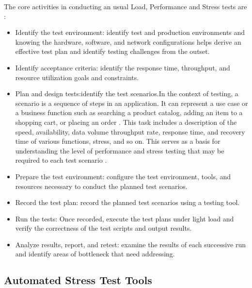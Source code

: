 The core activities in conducting an usual Load, Performance and Stress tests are \cite{Erinle2013}: 

\begin{itemize}
\item Identify the test environment: identify test and production environments and knowing the hardware, software, and network configurations helps derive an effective test plan and identify testing challenges from the outset.

\item Identify acceptance criteria: identify the response time, throughput, and resource utilization goals and constraints.

\item Plan and design tests:identify the test scenarios.In the context of testing, a scenario is a sequence of steps in an application. It can represent a use case or a business function such as searching a product catalog, adding an item to a shopping cart, or placing an order \cite{Corporation2007}. This task includes a description
of the speed, availability, data volume throughput rate, response
time, and recovery time of various functions, stress, and so on. This
serves as a basis for understanding the level of performance and
stress testing that may be required to each test scenario \cite{Lewis2005}.

\item Prepare the test environment: configure the test environment, tools, and resources necessary to conduct the planned test scenarios.

\item Record the test plan: record the planned test scenarios using a testing tool.

\item Run the tests: Once recorded, execute the test plans under light load and verify the correctness of the test scripts and output results.

\item Analyze results, report, and retest: examine the results of each successive run and identify areas of bottleneck that need addressing.  

\end{itemize}



\subsection{Automated Stress Test Tools}

